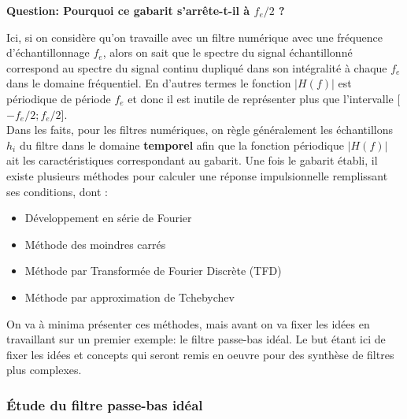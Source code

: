 \documentclass[11pt,a4paper]{article}
\begin{document}
\textbf{Question: Pourquoi ce gabarit s'arrête-t-il à $f_e/2$ ?}

Ici, si on considère qu'on travaille avec un filtre numérique avec une fréquence d'échantillonnage $f_e$, alors on sait que le spectre du signal échantillonné correspond au spectre du signal continu dupliqué dans son intégralité à chaque $f_e$ dans le domaine fréquentiel. En d'autres termes le fonction $|H(f)|$ est périodique de période $f_e$ et donc il est inutile de représenter plus que l'intervalle [$-f_e/2;f_e/2$].\\

Dans les faits, pour les filtres numériques, on règle généralement les échantillons $h_i$ du filtre dans le domaine \textbf{temporel} afin que la fonction périodique $|H(f)|$ ait les caractéristiques correspondant au gabarit. Une fois le gabarit établi, il existe plusieurs méthodes pour calculer une réponse impulsionnelle remplissant ses conditions, dont :
\begin{itemize}
\item Développement en série de Fourier
\item Méthode des moindres carrés
\item Méthode par Transformée de Fourier Discrète (TFD)
\item Méthode par approximation de Tchebychev
\end{itemize}

On va à minima présenter ces méthodes, mais avant on va fixer les idées en travaillant sur un premier exemple: le filtre passe-bas idéal. Le but étant ici de fixer les idées et concepts qui seront remis en oeuvre pour des synthèse de filtres plus complexes.\\

\subsubsection{Étude du filtre passe-bas idéal}

\begin{center}
\end{center}
\end{document}
